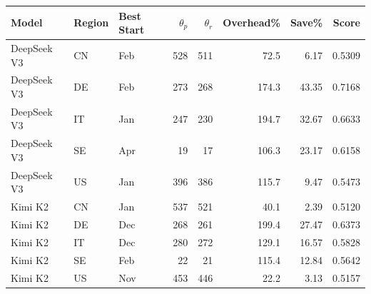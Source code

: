 \begin{tabular}{lllrrrrr}
\toprule
Model & Region & Best Start & $\theta_p$ & $\theta_r$ & Overhead\% & Save\% & Score \\
\midrule
DeepSeek V3 & CN & Feb & 528 & 511 & 72.5 & 6.17 & 0.5309 \\
DeepSeek V3 & DE & Feb & 273 & 268 & 174.3 & 43.35 & 0.7168 \\
DeepSeek V3 & IT & Jan & 247 & 230 & 194.7 & 32.67 & 0.6633 \\
DeepSeek V3 & SE & Apr & 19 & 17 & 106.3 & 23.17 & 0.6158 \\
DeepSeek V3 & US & Jan & 396 & 386 & 115.7 & 9.47 & 0.5473 \\
Kimi K2 & CN & Jan & 537 & 521 & 40.1 & 2.39 & 0.5120 \\
Kimi K2 & DE & Dec & 268 & 261 & 199.4 & 27.47 & 0.6373 \\
Kimi K2 & IT & Dec & 280 & 272 & 129.1 & 16.57 & 0.5828 \\
Kimi K2 & SE & Feb & 22 & 21 & 115.4 & 12.84 & 0.5642 \\
Kimi K2 & US & Nov & 453 & 446 & 22.2 & 3.13 & 0.5157 \\
\bottomrule
\end{tabular}
